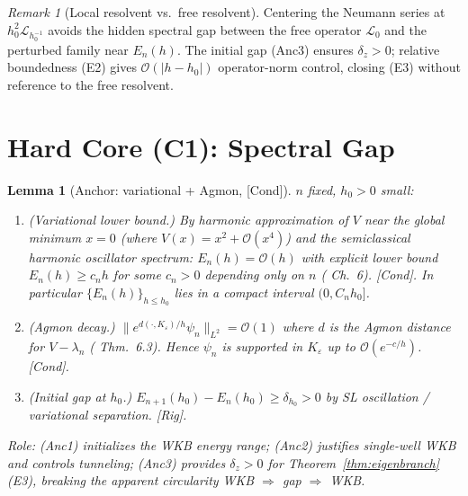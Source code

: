 \documentclass[12pt,a4paper]{amsart}
\newtheorem{lemma}[theorem]{Lemma}
\theoremstyle{definition}
\theoremstyle{remark}
\newtheorem{remark}[theorem]{Remark}
\newcommand{\Rig}{\textup{[Rig]}}
\newcommand{\Cond}{\textup{[Cond]}}
\begin{document}
\begin{remark}[Local resolvent vs.\ free resolvent]
Centering the Neumann series at $h_0^2\mathcal{L}_{h_0^{-1}}$
avoids the hidden spectral gap between the free operator $\mathcal{L}_0$
and the perturbed family near $E_n(h)$.
The initial gap (Anc3) ensures $\delta_z>0$;
relative boundedness (E2) gives $\mathcal{O}(|h-h_0|)$ operator-norm control,
closing (E3) without reference to the free resolvent.
\end{remark}

\section{Hard Core (C1): Spectral Gap}
\label{sec:specgap}

\begin{lemma}[Anchor: variational + Agmon, \Cond]
\label{lem:anchor}
$n$ fixed, $h_0>0$ small:
\begin{enumerate}[{\rm(Anc1)}]
\item \textit{(Variational lower bound.)}
  By harmonic approximation of $V$ near the global minimum $x=0$
  (where $V(x)=x^2+\mathcal{O}(x^4)$) and the
  semiclassical harmonic oscillator spectrum:
  $E_n(h)=\mathcal{O}(h)$ with explicit lower bound
  $E_n(h)\ge c_n h$ for some $c_n>0$ depending only on $n$
  (\cite{Zworski2012} Ch.~6). \Cond.
  In particular $\{E_n(h)\}_{h\le h_0}$ lies in a compact interval $(0,C_n h_0]$.
\item \textit{(Agmon decay.)}
  $\|e^{d(\cdot,K_\varepsilon)/h}\psi_n\|_{L^2}=\mathcal{O}(1)$
  where $d$ is the Agmon distance for $V-\lambda_n$
  (\cite{Zworski2012} Thm.~6.3).
  Hence $\psi_n$ is supported in $K_\varepsilon$ up to $\mathcal{O}(e^{-c/h})$. \Cond.
\item \textit{(Initial gap at $h_0$.)}
  $E_{n+1}(h_0)-E_n(h_0)\ge\delta_{h_0}>0$
  by SL oscillation / variational separation. \Rig.
\end{enumerate}
\emph{Role:} (Anc1) initializes the WKB energy range;
(Anc2) justifies single-well WKB and controls tunneling;
(Anc3) provides $\delta_z>0$ for Theorem~\ref{thm:eigenbranch}(E3),
breaking the apparent circularity
WKB $\Rightarrow$ gap $\Rightarrow$ WKB.
\end{lemma}
\end{document}
